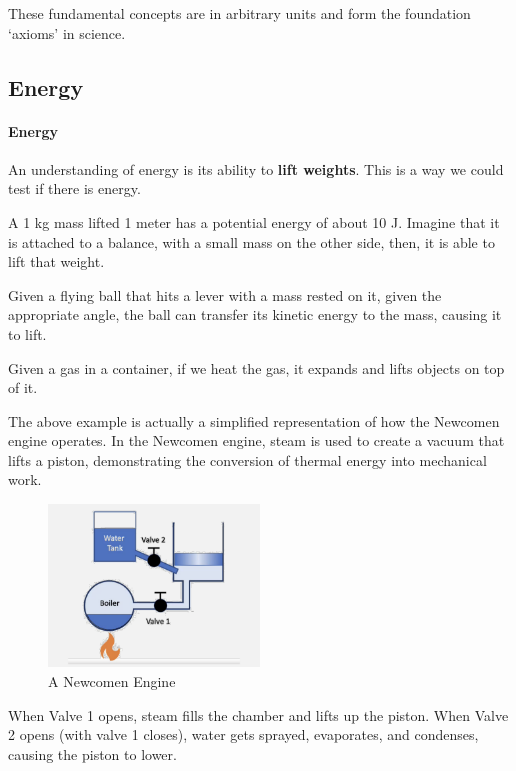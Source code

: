 \documentclass[11pt]{report}
\begin{document}
These fundamental concepts are in arbitrary units and form the foundation `axioms' in science.

\subsection{Energy}
\paragraph{Energy} An understanding of energy is its ability to \textbf{lift weights}. This is a way we could test if there is energy.
\begin{example}
    A 1 kg mass lifted 1 meter has a potential energy of about 10 J. Imagine that it is attached to a balance, with a small mass on the other side, then, it is able to lift that weight.
\end{example}

\begin{example}
    Given a flying ball that hits a lever with a mass rested on it, given the appropriate angle, the ball can transfer its kinetic energy to the mass, causing it to lift.
\end{example}

\begin{example}[Heat]
    Given a gas in a container, if we heat the gas, it expands and lifts objects on top of it.
\end{example}
\begin{shaded}
\begin{example}
    The above example is actually a simplified representation of how the Newcomen engine operates. In the Newcomen engine, steam is used to create a vacuum that lifts a piston, demonstrating the conversion of thermal energy into mechanical work.
\end{example}
\end{shaded}
\begin{figure}[h!]
    \centering
    \includegraphics[width=0.5\textwidth]{newcomen_engine.png}
    \caption{A Newcomen Engine}
\end{figure}
When Valve 1 opens, steam fills the chamber and lifts up the piston. When Valve 2 opens (with valve 1 closes),
water gets sprayed, evaporates, and condenses, causing the piston to lower.
\end{document}
